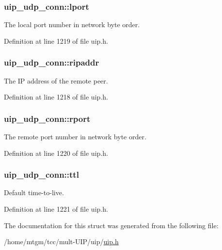 \hypertarget{structuip__udp__conn_a981392e295db4d024eea95805c51c371}{
\subsubsection[{lport}]{ {\bf uip\_\-udp\_\-conn::lport}}}
\label{structuip__udp__conn_a981392e295db4d024eea95805c51c371}
The local port number in network byte order. 

Definition at line 1219 of file uip.h.

\hypertarget{structuip__udp__conn_a8a661a2d544100b82d0d14a1985083d5}{
\subsubsection[{ripaddr}]{ {\bf uip\_\-udp\_\-conn::ripaddr}}}
\label{structuip__udp__conn_a8a661a2d544100b82d0d14a1985083d5}
The IP address of the remote peer. 

Definition at line 1218 of file uip.h.

\hypertarget{structuip__udp__conn_a280a0c2a93544e597f92bbacf36ee1dc}{
\subsubsection[{rport}]{ {\bf uip\_\-udp\_\-conn::rport}}}
\label{structuip__udp__conn_a280a0c2a93544e597f92bbacf36ee1dc}
The remote port number in network byte order. 

Definition at line 1220 of file uip.h.

\hypertarget{structuip__udp__conn_a4da1d7815516cd2b5bda3a66fdf05198}{
\subsubsection[{ttl}]{ {\bf uip\_\-udp\_\-conn::ttl}}}
\label{structuip__udp__conn_a4da1d7815516cd2b5bda3a66fdf05198}
Default time-\/to-\/live. 

Definition at line 1221 of file uip.h.



The documentation for this struct was generated from the following file:\begin{DoxyCompactItemize}
\item 
/home/mtgm/tcc/mult-\/UIP/uip/\hyperlink{uip_8h}{uip.h}\end{DoxyCompactItemize}
